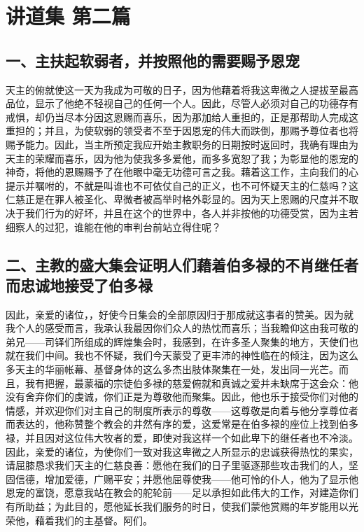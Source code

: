 
\section{讲道集 第二篇}

\par


\subsection{一、主扶起软弱者，并按照他的需要赐予恩宠}

天主的俯就使这一天为我成为可敬的日子，因为他藉着将我这卑微之人提拔至最高品位，显示了他绝不轻视自己的任何一个人。因此，尽管人必须对自己的功德存有戒惧，却仍当尽本分因这恩赐而喜乐，因为那加给人重担的，正是那帮助人完成这重担的；并且，为使软弱的领受者不至于因恩宠的伟大而跌倒，那赐予尊位者也将赐予能力。因此，当主所预定我应开始主教职务的日期按时返回时，我确有理由为天主的荣耀而喜乐，因为他为使我多多爱他，而多多宽恕了我；为彰显他的恩宠的神奇，将他的恩赐赐予了在他眼中毫无功德可言之我。藉着这工作，主向我们的心提示并嘱咐的，不就是叫谁也不可依仗自己的正义，也不可怀疑天主的仁慈吗？这仁慈正是在罪人被圣化、卑微者被高举时格外彰显的。因为天上恩赐的尺度并不取决于我们行为的好坏，并且在这个的世界中，各人并非按他的功德受赏，因为主若细察人的过犯，谁能在他的审判台前站立得住呢？\par


\subsection{二、主教的盛大集会证明人们藉着伯多禄的不肖继任者而忠诚地接受了伯多禄}

因此，亲爱的诸位，，好使今日集会的全部原因归于那成就这事者的赞美。因为就我个人的感受而言，我承认我最因你们众人的热忱而喜乐；当我瞻仰这由我可敬的弟兄——司铎们所组成的辉煌集会时，我感到，在许多圣人聚集的地方，天使们也就在我们中间。我也不怀疑，我们今天蒙受了更丰沛的神性临在的倾注，因为这么多天主的华丽帐幕、基督身体的这么多杰出肢体聚集在一处，发出同一光芒。而且，我有把握，最蒙福的宗徒伯多禄的慈爱俯就和真诚之爱并未缺席于这会众：他没有舍弃你们的虔诚，你们正是为尊敬他而聚集。因此，他也乐于接受你们对他的情感，并欢迎你们对主自己的制度所表示的尊敬——这尊敬是向着与他分享尊位者而表达的，他称赞整个教会的井然有序的爱，这爱常是在伯多禄的座位上找到伯多禄，并且因对这位伟大牧者的爱，即使对我这样一个如此卑下的继任者也不冷淡。因此，亲爱的诸位，为使你们一致对我这卑微之人所显示的忠诚获得热忱的果实，请屈膝恳求我们天主的仁慈良善：愿他在我们的日子里驱逐那些攻击我们的人，坚固信德，增加爱德，广赐平安；并愿他屈尊使我——他可怜的仆人，他为了显示他恩宠的富饶，愿意我站在教会的舵轮前——足以承担如此伟大的工作，对建造你们有所助益；为此目的，愿他延长我们服务的时日，使我们蒙他赏赐的年岁能用以光荣他，藉着我们的主基督。阿们。\par

